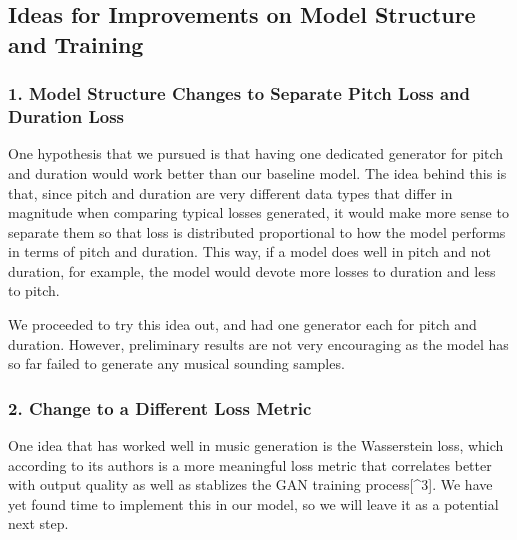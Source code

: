 \documentclass[12pt,oneside]{chicagocapstone}
\begin{document}
\hypertarget{ideas-for-improvements-on-model-structure-and-training}{%
\subsection*{Ideas for Improvements on Model Structure and Training}\label{ideas-for-improvements-on-model-structure-and-training}}

\hypertarget{model-structure-changes-to-separate-pitch-loss-and-duration-loss}{%
\subsubsection*{1. Model Structure Changes to Separate Pitch Loss and Duration Loss}\label{model-structure-changes-to-separate-pitch-loss-and-duration-loss}}

One hypothesis that we pursued is that having one dedicated generator for pitch and duration would work better than our baseline model. The idea behind this is that, since pitch and duration are very different data types that differ in magnitude when comparing typical losses generated, it would make more sense to separate them so that loss is distributed proportional to how the model performs in terms of pitch and duration. This way, if a model does well in pitch and not duration, for example, the model would devote more losses to duration and less to pitch.

We proceeded to try this idea out, and had one generator each for pitch and duration. However, preliminary results are not very encouraging as the model has so far failed to generate any musical sounding samples.

\hypertarget{change-to-a-different-loss-metric}{%
\subsubsection*{2. Change to a Different Loss Metric}\label{change-to-a-different-loss-metric}}

One idea that has worked well in music generation is the Wasserstein loss, which according to its authors is a more meaningful loss metric that correlates better with output quality as well as stablizes the GAN training process{[}\^{}3{]}. We have yet found time to implement this in our model, so we will leave it as a potential next step.
\end{document}
